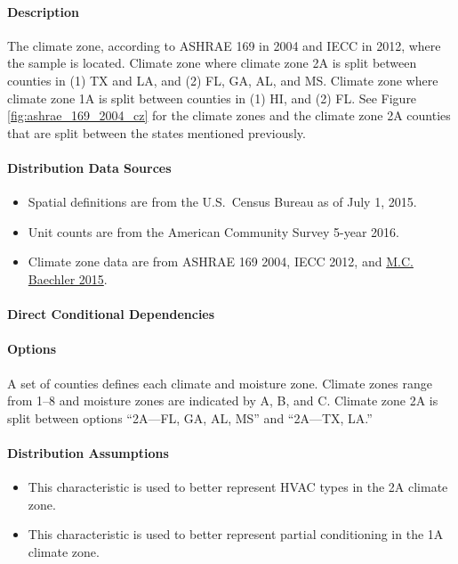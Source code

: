 \paragraph{Description}
% 
The climate zone, according to ASHRAE 169 in 2004 and IECC in 2012, where the sample is located. Climate zone where climate zone 2A is split between counties in (1) TX and LA, and (2) FL, GA, AL, and MS. Climate zone where climate zone 1A is split between counties in (1) HI, and (2) FL. See Figure \ref{fig:ashrae_169_2004_cz} for the climate zones and the climate zone 2A counties that are split between the states mentioned previously.

\paragraph{Distribution Data Sources}
% 
\begin{itemize}
    \item Spatial definitions are from the U.S.~Census Bureau as of July 1, 2015.
    \item Unit counts are from the American Community Survey 5-year 2016.
    \item Climate zone data are from ASHRAE 169 2004, IECC 2012, and \href{https://www.energy.gov/sites/prod/files/2015/10/f27/ba_climate_region_guide_7.3.pdf}{M.C. Baechler 2015}.
\end{itemize}

\paragraph{Direct Conditional Dependencies}


\paragraph{Options}
A set of counties defines each climate and moisture zone. Climate zones range from 1--8 and moisture zones are indicated by A, B, and C. Climate zone 2A is split between options ``2A---FL, GA, AL, MS'' and ``2A---TX, LA.''

\paragraph{Distribution Assumptions}
% 
\begin{itemize}
    \item This characteristic is used to better represent HVAC types in the 2A climate zone.
    \item This characteristic is used to better represent partial conditioning in the 1A climate zone.
\end{itemize}
